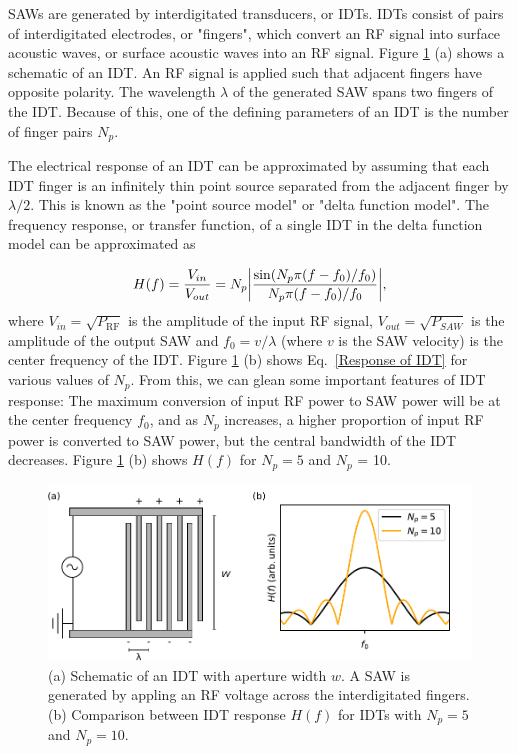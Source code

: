 \documentclass[double,12pt,1in,seploa]{beavtex}
\begin{document}
SAWs are generated by interdigitated transducers, or IDTs. IDTs consist of pairs of interdigitated electrodes, or "fingers", which convert an RF signal into surface acoustic waves, or surface acoustic waves into an RF signal. Figure \ref{SAW diagram} (a) shows a schematic of an IDT. An RF signal is applied such that adjacent fingers have opposite polarity. The wavelength $\lambda$ of the generated SAW spans two fingers of the IDT. Because of this, one of the defining parameters of an IDT is the number of finger pairs $N_p$. 

The electrical response of an IDT can be approximated by assuming that each IDT finger is an infinitely thin point source separated from the adjacent finger by $\lambda/2$. This is known as the "point source model" or "delta function model". The frequency response, or transfer function, of a single IDT in the delta function model can be approximated as 

\begin{equation}
    \begin{split}
        H(f) = \frac{V_{in}}{V_{out}} = N_p \abs{\frac{\sin (N_p \pi (f-f_0) / f_0)}{N_p \pi (f-f_0) / f_0}},
    \end{split}
    \label{Response of IDT}
\end{equation}
where $V_{in} = \sqrt{P_{\mathrm{RF}}}$ is the amplitude of the input RF signal, $V_{out} = \sqrt{P_{SAW}}$ is the amplitude of the output SAW and $f_0 = v/\lambda$ (where $v$ is the SAW velocity) is the center frequency of the IDT. Figure \ref{SAW diagram} (b) shows Eq.\ \ref{Response of IDT} for various values of $N_p$. From this, we can glean some important features of IDT response: The maximum conversion of input RF power to SAW power will be at the center frequency $f_0$, and as $N_p$ increases, a higher proportion of input RF power is converted to SAW power, but the central bandwidth of the IDT decreases. Figure \ref{SAW diagram} (b) shows $H(f)$ for $N_p = 5$ and $N_p$ = 10.

\begin{figure}
    \includegraphics{SAW diagram.pdf}
    \caption{(a) Schematic of an IDT with aperture width $w$. A SAW is generated by appling an RF voltage across the interdigitated fingers. (b) Comparison between IDT response $H(f)$ for IDTs with $N_p = 5$ and $N_p = 10$.}
    \label{SAW diagram}
\end{figure}
\end{document}
